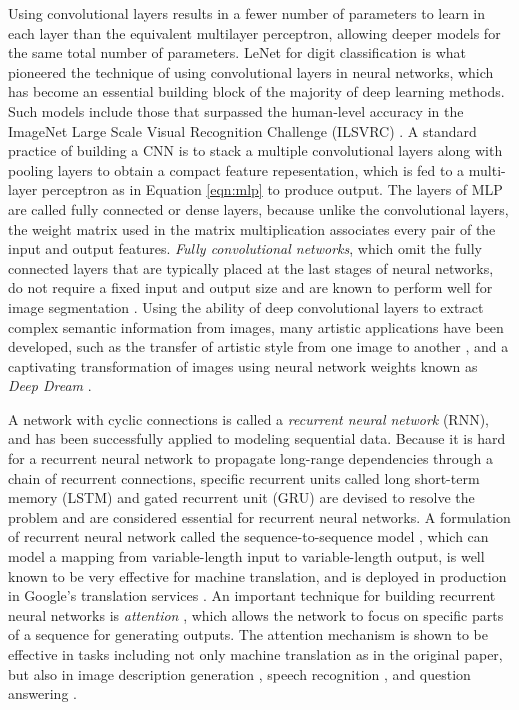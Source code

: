 Using convolutional layers results in a fewer number of parameters to learn in each layer than the equivalent multilayer perceptron, allowing deeper models for the same total number of parameters.
LeNet \cite{lecun1995lenet} for digit classification is what pioneered the technique of using convolutional layers in neural networks, which has become an essential building block of the majority of deep learning methods.
Such models include those that surpassed the human-level accuracy in the ImageNet Large Scale Visual Recognition Challenge (ILSVRC) \cite{krizhevsky2012imagenet, simonyan2014vgg, szegedy2015googlenet, he2016resnet}.
A standard practice of building a CNN is to stack a multiple convolutional layers along with pooling layers to obtain a compact feature repesentation, which is fed to a multi-layer perceptron as in Equation \ref{eqn:mlp} to produce output.
The layers of MLP are called fully connected or dense layers, because unlike the convolutional layers, the weight matrix used in the matrix multiplication associates every pair of the input and output features.
\emph{Fully convolutional networks}, which omit the fully connected layers that are typically placed at the last stages of neural networks, do not require a fixed input and output size and are known to perform well for image segmentation \cite{shelhamer2017fcn}.
Using the ability of deep convolutional layers to extract complex semantic information from images, many artistic applications have been developed, such as the transfer of artistic style from one image to another \cite{gatys2015style}, and a captivating transformation of images using neural network weights known as \emph{Deep Dream} \cite{mahendran2016deepdream}.


A network with cyclic connections is called a \emph{recurrent neural network} (RNN), and has been successfully applied to modeling sequential data.
Because it is hard for a recurrent neural network to propagate long-range dependencies through a chain of recurrent connections, specific recurrent units called long short-term memory (LSTM) \cite{hochreiter1997lstm} and gated recurrent unit (GRU) \cite{cho2014seq2seq} are devised to resolve the problem and are considered essential for recurrent neural networks.
A formulation of recurrent neural network called the sequence-to-sequence model \cite{cho2014seq2seq,sutskever2014seq2seq}, which can model a mapping from variable-length input to variable-length output, is well known to be very effective for machine translation, and is deployed in production in Google's translation services \cite{wu2016google}.
An important technique for building recurrent neural networks is \emph{attention} \cite{bahdanau2014attention}, which allows the network to focus on specific parts of a sequence for generating outputs.
The attention mechanism is shown to be effective in tasks including not only machine translation as in the original paper, but also in image description generation \cite{karpathy2017desc}, speech recognition \cite{chorowski2015speech}, and question answering \cite{sukhbaatar2015memory}.

